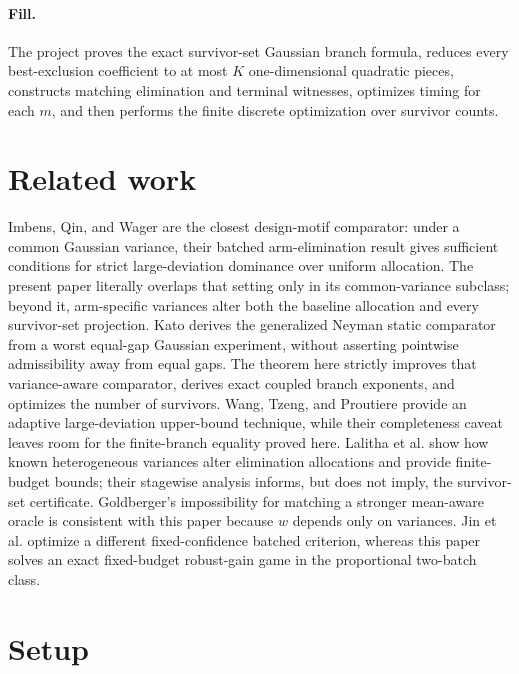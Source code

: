 \documentclass{article}
\begin{document}
\paragraph{Fill.} The project proves the exact survivor-set Gaussian branch formula, reduces every best-exclusion coefficient to at most \(K\) one-dimensional quadratic pieces, constructs matching elimination and terminal witnesses, optimizes timing for each \(m\), and then performs the finite discrete optimization over survivor counts.

\section{Related work}

Imbens, Qin, and Wager are the closest design-motif comparator: under a common Gaussian variance, their batched arm-elimination result gives sufficient conditions for strict large-deviation dominance over uniform allocation. The present paper literally overlaps that setting only in its common-variance subclass; beyond it, arm-specific variances alter both the baseline allocation and every survivor-set projection. Kato derives the generalized Neyman static comparator from a worst equal-gap Gaussian experiment, without asserting pointwise admissibility away from equal gaps. The theorem here strictly improves that variance-aware comparator, derives exact coupled branch exponents, and optimizes the number of survivors. Wang, Tzeng, and Proutiere provide an adaptive large-deviation upper-bound technique, while their completeness caveat leaves room for the finite-branch equality proved here. Lalitha et al. show how known heterogeneous variances alter elimination allocations and provide finite-budget bounds; their stagewise analysis informs, but does not imply, the survivor-set certificate. Goldberger's impossibility for matching a stronger mean-aware oracle is consistent with this paper because \(w\) depends only on variances. Jin et al. optimize a different fixed-confidence batched criterion, whereas this paper solves an exact fixed-budget robust-gain game in the proportional two-batch class.

\section{Setup}
\end{document}
